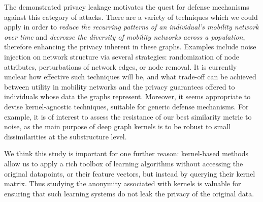 The demonstrated privacy leakage motivates the quest
for defense mechanisms against this category of attacks.
There are a variety of techniques which we could apply in order to \emph{reduce the recurring patterns of an individual's mobility network over time} and \emph{decrease the diversity of mobility networks across a population}, therefore enhancing the privacy inherent in these graphs.
Examples include noise injection on network structure via several strategies: randomization of node attributes, perturbations of network edges, or node removal.
It is currently unclear how effective such techniques will be, and what trade-off can be achieved between utility in mobility networks and the privacy guarantees offered to individuals whose data the graphs represent.
Moreover, it seems appropriate to devise kernel-agnostic techniques, suitable for generic defense mechanisms.
For example, it is of interest to assess the resistance of our best similarity metric to noise, as the main purpose of deep graph kernels is to be robust to small dissimilarities at the substructure level.

We think this study is important for one further reason: kernel-based methods allow us to apply a rich toolbox
of learning algorithms without accessing the original datapoints, or their feature vectors, but instead by querying their kernel matrix.
Thus studying the anonymity associated with kernels is valuable for ensuring that such learning systems do not leak the privacy of the original data.
